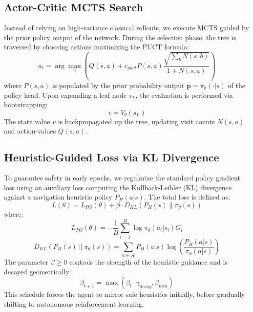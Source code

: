 \documentclass{article}
\begin{document}
\subsection{Actor-Critic MCTS Search}
Instead of relying on high-variance classical rollouts, we execute MCTS guided by the prior policy output of the network. During the selection phase, the tree is traversed by choosing actions maximizing the PUCT formula:
\begin{equation}
    a_t = \arg\max_a \left( Q(s, a) + c_{puct} P(s, a) \frac{\sqrt{\sum_b N(s, b)}}{1 + N(s, a)} \right)
\end{equation}
where $P(s, a)$ is populated by the prior probability output $\mathbf{p} = \pi_\theta(\cdot | s)$ of the policy head. Upon expanding a leaf node $s_L$, the evaluation is performed via bootstrapping:
\begin{equation}
    v = V_\theta(s_L)
\end{equation}
The state value $v$ is backpropagated up the tree, updating visit counts $N(s, a)$ and action-values $Q(s, a)$.

\subsection{Heuristic-Guided Loss via KL Divergence}
To guarantee safety in early epochs, we regularize the standard policy gradient loss using an auxiliary loss computing the Kullback-Leibler (KL) divergence against a navigation heuristic policy $P_H(a|s)$. The total loss is defined as:
\begin{equation}
    L(\theta) = L_{PG}(\theta) + \beta \cdot D_{KL}(P_H(s) \parallel \pi_\theta(s))
\end{equation}
where:
\begin{equation}
    L_{PG}(\theta) = - \frac{1}{B} \sum_{i=1}^B \log \pi_\theta(a_i | s_i) G_i
\end{equation}
\begin{equation}
    D_{KL}(P_H(s) \parallel \pi_\theta(s)) = \sum_{a \in \mathcal{A}} P_H(a|s) \log \left( \frac{P_H(a|s)}{\pi_\theta(a|s)} \right)
\end{equation}
The parameter $\beta \ge 0$ controls the strength of the heuristic guidance and is decayed geometrically:
\begin{equation}
    \beta_{t+1} = \max(\beta_t \cdot \gamma_{decay}, \beta_{min})
\end{equation}
This schedule forces the agent to mirror safe heuristics initially, before gradually shifting to autonomous reinforcement learning.
\end{document}
